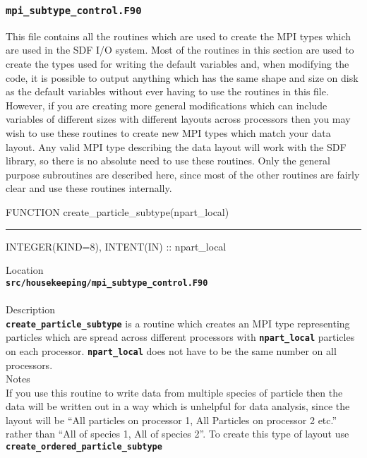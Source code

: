 \documentclass[12pt,a4paper]{article}
\newcommand{\HRule}{\rule[0.3cm]{\linewidth}{0.5mm}}
\newcommand{\inlinecode}[1]{{\color{warwickred} \bf\texttt{#1}}}
\begin{document}
\subsubsection{\inlinecode{mpi\_subtype\_control.F90}}
This file contains all the routines which are used to create the MPI types
which are used in the SDF I/O system. Most of the routines in this section are
used to create the types used for writing the default variables and,
when modifying the code, it is possible to output anything which has the same
shape and size on disk as the default variables without ever having to use the
routines in this file. However, if you are creating more general modifications
which can include variables of different sizes with different layouts across
processors then you may wish to use these routines to create new MPI types which
match your data layout. Any valid MPI type describing the data layout will work
with the SDF library, so there is no absolute need to use these routines. Only
the general purpose subroutines are described here, since most of the other
routines are fairly clear and use these routines internally.

\pagebreak
\begin{codedef}
FUNCTION create_particle_subtype(npart_local)
\HRule
INTEGER(KIND=8), INTENT(IN) :: npart_local
\end{codedef}
\vspace{1cm}
{\Large Location\\}
\inlinecode{src/housekeeping/mpi\_subtype\_control.F90}\\
\\[0.5cm]
{\Large Description\\}
\inlinecode{create\_particle\_subtype} is a routine which creates an MPI type
representing particles which are spread across different processors with
\inlinecode{npart\_local} particles on each
processor. \inlinecode{npart\_local} does not have to be the same number on all
processors.
\\[0.5cm]
{\Large Notes\\}
If you use this routine to write data from multiple species of particle then
the data will be written out in a way which is unhelpful for data analysis,
since the layout will be ``All particles on processor 1, All Particles on
processor 2 etc.'' rather than ``All of species 1, All of species 2''. To create
this type of layout use \inlinecode{create\_ordered\_particle\_subtype}
\end{document}
